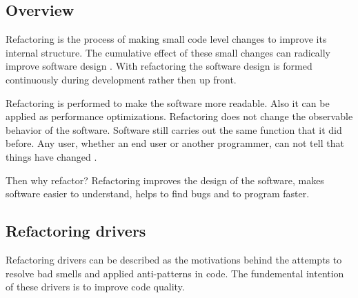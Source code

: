 \subsection{Overview}



Refactoring is the process of making small code level changes to improve its internal structure. The cumulative effect of these small changes can radically improve software design \cite{fowlerRefactor}. With refactoring the software design is formed continuously during development rather then up front. 

Refactoring is performed to make the software more readable. Also it can be applied as performance optimizations. Refactoring does not change the observable behavior of the software. Software still carries out the same function that it did before. Any user, whether an end user or another programmer, can not tell that things have changed \cite{fowlerRefactor}.  

Then why refactor? Refactoring improves the design of the software, makes software easier to understand, helps to find bugs and to program faster.

\subsection{Refactoring drivers}  
Refactoring drivers can be described as the motivations behind the attempts to resolve bad smells and applied anti-patterns in code. The fundemental intention of these drivers is to improve code quality. 


